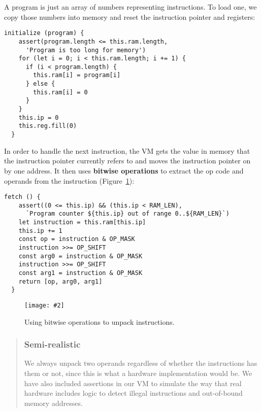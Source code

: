 \documentclass[krantzl]{krantz}
\newcommand{\figpdf}[4]{\begin{figure}%
\centering%
\texttt{[image: \#2]}%
\caption{#3}%
\label{#1}%
\end{figure}}
\newcommand{\figref}[1]{Figure~\ref{#1}}
\newcommand{\glossref}[1]{\textbf{#1}}
\newenvironment{callout}{\savenotes\begin{tBox}\begin{quotation}\toggletrue{inbox}\renewcommand{\thempfootnote}{\arabic{footnote}}}{\end{quotation}\vspace{\baselineskip}\end{tBox}\togglefalse{inbox}\spewnotes}
\begin{document}
A program is just an array of numbers representing instructions.
To load one,
we copy those numbers into memory and reset the instruction pointer and registers:


\begin{lstlisting}[frame=single,frameround=tttt]
  initialize (program) {
    assert(program.length <= this.ram.length,
      'Program is too long for memory')
    for (let i = 0; i < this.ram.length; i += 1) {
      if (i < program.length) {
        this.ram[i] = program[i]
      } else {
        this.ram[i] = 0
      }
    }
    this.ip = 0
    this.reg.fill(0)
  }
\end{lstlisting}



In order to handle the next instruction,
the VM gets the value in memory that the instruction pointer currently refers to
and moves the instruction pointer on by one address.
It then uses \glossref{bitwise operations}
to extract the op code and operands from the instruction
(\figref{virtual-machine-unpacking}):


\begin{lstlisting}[frame=single,frameround=tttt]
  fetch () {
    assert((0 <= this.ip) && (this.ip < RAM_LEN),
      `Program counter ${this.ip} out of range 0..${RAM_LEN}`)
    let instruction = this.ram[this.ip]
    this.ip += 1
    const op = instruction & OP_MASK
    instruction >>= OP_SHIFT
    const arg0 = instruction & OP_MASK
    instruction >>= OP_SHIFT
    const arg1 = instruction & OP_MASK
    return [op, arg0, arg1]
  }
\end{lstlisting}


\figpdf{virtual-machine-unpacking}{./virtual-machine/unpacking.pdf}{Using bitwise operations to unpack instructions.}{0.6}

\begin{callout}


\subsubsection*{Semi-realistic}


We always unpack two operands regardless of whether the instructions has them or not,
since this is what a hardware implementation would be.
We have also included assertions in our VM
to simulate the way that real hardware includes logic
to detect illegal instructions and out-of-bound memory addresses.

\end{callout}
\end{document}
